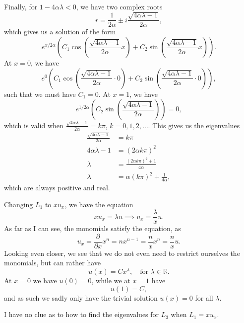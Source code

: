 \begin{solution}{4.6}
    Finally, for $1 - 4 \alpha \lambda < 0$, we have two complex roots
    \begin{equation}
        r = \frac{1}{2\alpha} \pm i \frac{\sqrt{4 \alpha \lambda - 1}}{2\alpha},
    \end{equation}
    which gives us a solution of the form
    \begin{equation}
        e^{x / 2\alpha} \left(
            C_1 \cos\left(\frac{\sqrt{4 \alpha \lambda - 1}}{2\alpha} x\right)
            + C_2 \sin\left(\frac{\sqrt{4 \alpha \lambda - 1}}{2\alpha} x\right)
        \right).
    \end{equation}
    At $x = 0$, we have
    \begin{equation}
        e^{0} \left(
            C_1 \cos\left(\frac{\sqrt{4 \alpha \lambda - 1}}{2\alpha} \cdot 0 \right)
            + C_2 \sin\left(\frac{\sqrt{4 \alpha \lambda - 1}}{2\alpha} \cdot 0 \right)
        \right),
    \end{equation}
    such that we must have $C_1 = 0$.
    At $x = 1$, we have
    \begin{equation}
        e^{1 / 2\alpha} \left( C_2 \sin\left(\frac{\sqrt{4 \alpha \lambda - 1}}{2\alpha}\right) \right) = 0,
    \end{equation}
    which is valid when $\frac{\sqrt{4 \alpha \lambda - 1}}{2\alpha} = k \pi$, $k = 0, 1, 2, \ldots$.
    This gives us the eigenvalues
    \begin{align*}
        \frac{\sqrt{4 \alpha \lambda - 1}}{2\alpha} &= k \pi \\
        4 \alpha \lambda - 1 &= (2\alpha k \pi)^2 \\
        \lambda &= \frac{(2 \alpha k \pi)^2 + 1}{4 \alpha} \\
        \lambda &= \alpha (k \pi)^2 + \frac{1}{4 \alpha},
    \end{align*}
    which are always positive and real.

    Changing $L_1$ to $x u_x$, we have the equation
    \begin{equation}
        x u_x = \lambda u \implies u_x = \frac{\lambda}{x} u.
    \end{equation}
    As far as I can see, the monomials satisfy the equation, as
    \begin{equation}
        u_x = \frac{\partial}{\partial x} x^n = n x^{n - 1} = \frac{n}{x} x^n = \frac{n}{x} u.
    \end{equation}
    Looking even closer, we see that we do not even need to restrict ourselves the monomials, but can rather have
    \begin{equation}
        u(x) = C x^\lambda,
        \quad \text{for }
        \lambda \in \mathbb{R}.
    \end{equation}
    At $x = 0$ we have $u(0) = 0$, while we at $x = 1$ have
    \begin{equation}
        u(1) = C,
    \end{equation}
    and as such we sadly only have the trivial solution $u(x) = 0$ for all $\lambda$.

    I have no clue as to how to find the eigenvalues for $L_3$ when $L_1 = x u_x$.
\end{solution}

